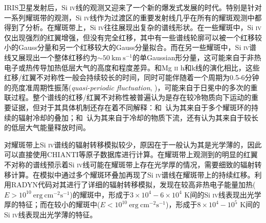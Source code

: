 IRIS卫星发射后，Si \textsc{iv}线的观测又迎来了一个新的爆发式发展的时代。特别是针对一系列耀斑带的观测，Si \textsc{iv}线作为过渡区的重要发射线几乎在所有的耀斑观测中都得到了分析。在耀斑带上，Si \textsc{iv}往往展现出复杂的谱线形状。在一些耀斑中，Si \textsc{iv}仅出现强烈的红翼增强，但没有完全红移\parencites{Tian2014,Tian2015,Tian2018,Brosius2015,Polito2016}，其中有一些谱线轮廓可以被一个红移较小的Gauss分量和另一个红移较大的Gauss分量拟合\parencites{Li2015,Lee2017}。而在另一些耀斑中，Si \textsc{iv}谱线又展现出一个整体红移约为$\sim50\ \mathrm{km}\ \mathrm{s^{-1}}$的单Gaussian形分量\parencites{LiD2017,Li2017}，这可能来自于非热电子或热传导加热低层大气的高度和程度差异\parencites{Li2017}。和Mg \textsc{ii} h和k线的演化相比，这些红移/红翼不对称性一般会持续较长的时间\parencites{Warren2016}，同时可能伴随着一个周期为0.5-6分钟的亮度准周期性振荡(\textit{quasi-periodic fluctuation}, \cites{Brosius2015,Zhang2016,Tian2018})，可能来自于日冕中的多次的重联过程\parencites{Brosius2015}。整个谱线的红移/红翼不对称性被普遍认为是存在较冷物质向下运动的重要证据，但对于其具体机制还存在着不同解释：\textcites{Reep2016}和~\textcites{Warren2016}认为其来自于多个耀斑环的持续的辐射冷却的叠加；\textcites{Tian2015}和~\textcites{Brannon2016}认为其来自于冷却的物质下流，还有认为其来自于较长的低层大气能量释放时间\parencites{Li2017}。

对耀斑带上Si \textsc{iv}谱线的辐射转移模拟较少，原因在于一般认为其是光学薄的，因此可以直接使用CHIANTI\parencites{Dere1997,Landi2013}等原子数据库进行计算。在耀斑带上观测到的明显的红翼不对称的谱线预示着Si \textsc{iv}线可能在耀斑带上存在光学厚的情况，需要细致的辐射转移计算。\textcites{Reep2016}在模拟中通过多个耀斑环叠加再现了Si \textsc{iv}谱线在耀斑带上的持续红移。\textcites{Kerr2019}利用RADYN代码对其进行了详细的辐射转移模拟，发现在较高非热电子能量加热($E>10^{10}\ \mathrm{erg}\ \mathrm{cm^{-2}s^{-1}}$)的耀斑中，形成于$3\times10^4-6\times10^4$ K间的Si \textsc{iv}线表现出光学厚的特征；而在较小的耀斑中($E<10^{10}\ \mathrm{erg}\ \mathrm{cm^{-2}s^{-1}}$)，形成于$8\times10^4-10^5$ K间的Si \textsc{iv}线表现出光学薄的特征。
